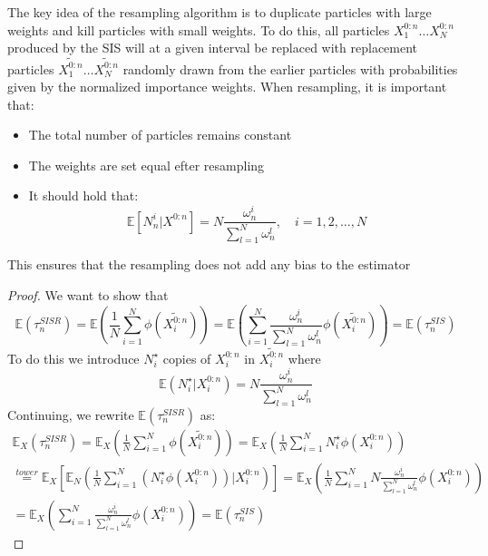 \documentclass[a4paper]{article}
\begin{document}
The key idea of the resampling algorithm is to duplicate particles with large weights and kill particles with small weights. To do this, all particles $X_1^{0:n} \dots X_N^{0:n}$ produced by the SIS will at a given interval be replaced with replacement particles $\tilde{X_1^{0:n}} \dots \tilde{X_N^{0:n}}$ randomly drawn from the earlier particles with probabilities given by the normalized importance weights. When resampling, it is important that:
\begin{itemize}
    \item The total number of particles remains constant
    \item The weights are set equal efter resampling
    \item It should hold that: 
    \begin{equation}
        \mathbb{E}[N_n^i|X^{0:n}] = N\frac{\omega_n^i}{\sum_{l=1}^N\omega_n^l}, \quad i = 1,2,\dots,N
    \end{equation}
\end{itemize}
This ensures that the resampling does not add any bias to the estimator
\begin{proof}
    We want to show that
    \begin{equation}
        \mathbb{E}(\tau_n^{SISR}) = \mathbb{E}\left(\frac{1}{N}\sum_{i=1}^N\phi(\tilde{X_i^{0:n}})\right) = \mathbb{E}\left(\sum_{i=1}^N\frac{\omega_n^i}{\sum_{l=1}^N\omega_n^l}\phi(\tilde{X_i^{0:n}})\right) = \mathbb{E}(\tau_n^{SIS})
    \end{equation}
    To do this we introduce $N_i^\star$ copies of $X_i^{0:n}$ in $\tilde{X_i^{0:n}}$ where
    \begin{equation}
        \mathbb{E}(N_i^\star|X_i^{0:n}) = N\frac{\omega_n^i}{\sum_{l=1}^N\omega_n^l}
    \end{equation}
    Continuing, we rewrite $\mathbb{E}(\tau_n^{SISR})$ as:
    \begin{equation}
        \begin{gathered}
            \mathbb{E}_X(\tau_n^{SISR}) = \mathbb{E}_X\left(\frac{1}{N}\sum_{i=1}^N\phi(\tilde{X_i^{0:n}})\right) = \mathbb{E}_X\left(\frac{1}{N}\sum_{i=1}^NN_i^\star\phi(X_i^{0:n})\right) \\
            \overset{tower}{=}\mathbb{E}_X\left[\mathbb{E}_N\left(\frac{1}{N}\sum_{i=1}^N(N_i^\star\phi(X_i^{0:n}))|X_i^{0:n}\right)\right] = \mathbb{E}_X\left(\frac{1}{N}\sum_{i=1}^N N\frac{\omega_n^i}{\sum_{l=1}^N\omega_n^l}\phi(X_i^{0:n})\right) \\
            = \mathbb{E}_X\left(\sum_{i=1}^N \frac{\omega_n^i}{\sum_{l=1}^N\omega_n^l}\phi(X_i^{0:n})\right) = \mathbb{E}(\tau_n^{SIS})
        \end{gathered}
    \end{equation}
\end{proof}
\end{document}
